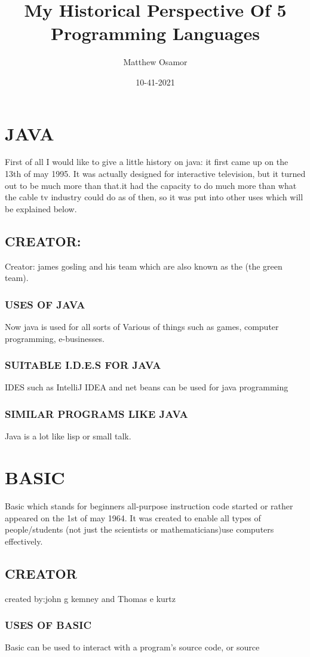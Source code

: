 \documentclass{article}
\title{My Historical Perspective Of 5 Programming Languages}
\date{10-41-2021}
\author{Matthew Osamor}
\begin{document}
		\maketitle
			\section{JAVA}
		First of all I would like to give a little history on java: it first came up on the 13th of may 1995.
		It was actually designed for interactive television, but it turned out to be much more than that.it had the capacity to do much more than what the cable tv industry could do as of then, so it was put into other uses which will be explained below.
		\subsection{CREATOR:}
		Creator: james gosling and his team which are also known as the (the green team).
		\subsubsection{USES OF JAVA}
		Now java is used for all sorts of Various of things such as games, computer programming, e-businesses.
		\subsubsection{SUITABLE I.D.E.S FOR JAVA}
		IDES such as IntelliJ IDEA and net beans can be used for java programming 
		\subsubsection{SIMILAR PROGRAMS LIKE JAVA}
		Java is a lot like lisp or small talk.
			\section{BASIC}
		Basic which stands for beginners all-purpose instruction code started or rather appeared on the 1st of may 1964.
		It was created to enable all types of people/students (not just the scientists  or mathematicians)use computers effectively.
		\subsection{CREATOR}
		created by:john g kemney and Thomas e kurtz 
		\subsubsection{USES OF BASIC}
		Basic can be used to interact with a program's source code, or source
\end{document}
